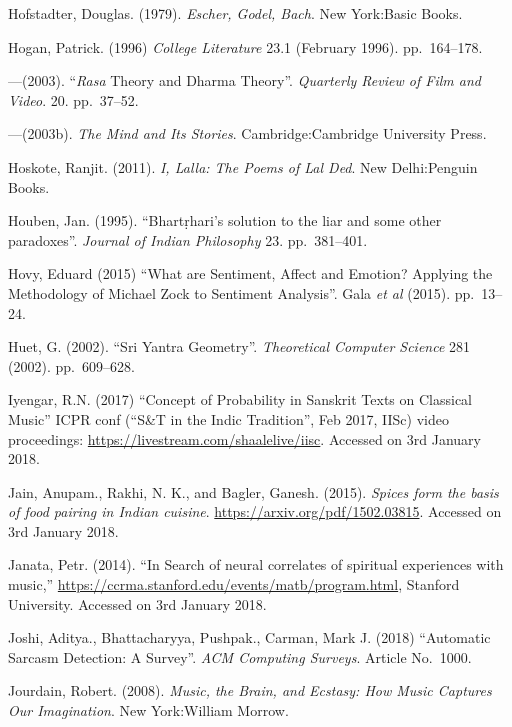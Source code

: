 \begin{thebibliography}{99}
Hofstadter, Douglas. (1979). \textsl{Escher, Godel, Bach}. New York:Basic Books.

Hogan, Patrick. (1996) \textsl{College Literature} 23.1 (February 1996). pp.~164--178.

---\kern3pt(2003). “\textsl{Rasa} Theory and Dharma Theory”. \textsl{Quarterly Review of Film and Video}. 20. pp.~37--52.

---\kern3pt(2003b). \textsl{The Mind and Its Stories}. Cambridge:Cambridge University Press.

Hoskote, Ranjit. (2011). \textsl{I, Lalla: The Poems of Lal Ded}. New Delhi:Penguin Books.

Houben, Jan. (1995). “Bhartṛhari's solution to the liar and some other paradoxes”. \textsl{Journal of Indian Philosophy} 23. pp.~381--401.

Hovy, Eduard (2015) “What are Sentiment, Affect and Emotion? Applying the Methodology of Michael Zock to Sentiment Analysis”. Gala \textsl{et al} (2015). pp.~13--24.

Huet, G. (2002). “Sri Yantra Geometry”. \textsl{Theoretical Computer Science} 281 (2002). pp.~609--628.

Iyengar, R.N. (2017) “Concept of Probability in Sanskrit Texts on Classical Music” ICPR conf (“S\&T in the Indic Tradition”, Feb 2017, IISc) video proceedings: \url{https://livestream.com/shaalelive/iisc}. Accessed on 3rd January 2018.

Jain, Anupam., Rakhi, N. K., and Bagler, Ganesh. (2015). \textsl{Spices form the basis of food pairing in Indian cuisine}. \url{https://arxiv.org/pdf/1502.03815}. Accessed on 3rd January 2018.

Janata, Petr. (2014). “In Search of neural correlates of spiritual experiences with music,” \url{https://ccrma.stanford.edu/events/matb/program.html}, Stanford University. Accessed on 3rd January 2018.

Joshi, Aditya., Bhattacharyya, Pushpak., Carman, Mark J. (2018) “Automatic Sarcasm Detection: A Survey”. \textsl{ACM Computing Surveys}. Article No.~1000.

Jourdain, Robert. (2008). \textsl{Music, the Brain, and Ecstasy: How Music Captures Our Imagination}. New York:William Morrow.


\end{thebibliography}
